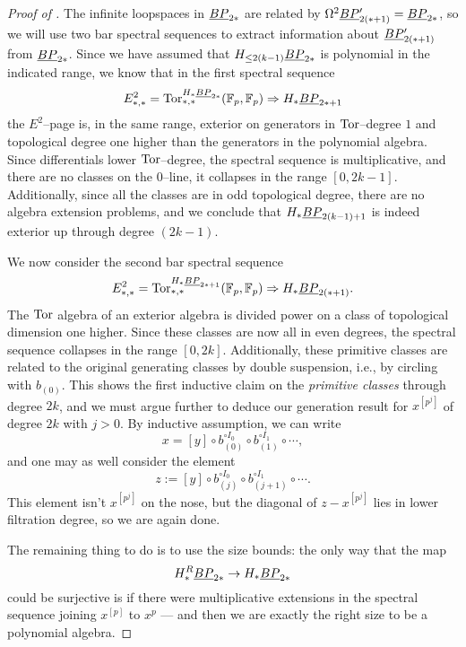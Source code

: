 \begin{proof}[{Proof of }]
The infinite loopspaces in $\underline{\smash{BP}}_{2*}$ are related by $\Omega^2 \underline{\smash{BP}}_{2(*+1)}' = \underline{\smash{BP}}_{2*}$, so we will use two bar spectral sequences to extract information about $\underline{\smash{BP}}_{2(*+1)}'$ from $\underline{\smash{BP}}_{2*}$.  Since we have assumed that $H_{\le 2(k-1)} \underline{\smash{BP}}_{2*}$ is polynomial in the indicated range, we know that in the first spectral sequence \[E^2_{*, *} = \operatorname{Tor}^{H_* \underline{\smash{BP}}_{2*}}_{*, *}(\mathbb F_p, \mathbb F_p) \Rightarrow H_* \underline{\smash{BP}}_{2*+1}\] the $E^2$--page is, in the same range, exterior on generators in $\operatorname{Tor}$--degree $1$ and topological degree one higher than the generators in the polynomial algebra.  Since differentials lower $\operatorname{Tor}$--degree, the spectral sequence is multiplicative, and there are no classes on the $0$--line, it collapses in the range $[0, 2k-1]$.  Additionally, since all the classes are in odd topological degree, there are no algebra extension problems, and we conclude that $H_* \underline{\smash{BP}}_{2(k-1)+1}$ is indeed exterior up through degree $(2k-1)$.

We now consider the second bar spectral sequence \[E^2_{*, *} = \operatorname{Tor}^{H_* \underline{\smash{BP}}_{2*+1}}_{*, *}(\mathbb F_p, \mathbb F_p) \Rightarrow H_* \underline{\smash{BP}}_{2(*+1)}.\]  The $\operatorname{Tor}$ algebra of an exterior algebra is divided power on a class of topological dimension one higher.  Since these classes are now all in even degrees, the spectral sequence collapses in the range $[0, 2k]$.  Additionally, these primitive classes are related to the original generating classes by double suspension, i.e., by circling with $b_{(0)}$.  This shows the first inductive claim on the \emph{primitive classes} through degree $2k$, and we must argue further to deduce our generation result for $x^{[p^j]}$ of degree $2k$ with $j > 0$.  By inductive assumption, we can write \[x = [y] \circ b_{(0)}^{\circ I_0} \circ b_{(1)}^{\circ I_1} \circ \cdots,\] and one may as well consider the element \[z := [y] \circ b_{(j)}^{\circ I_0} \circ b_{(j+1)}^{\circ I_1} \circ \cdots.\]  This element isn't $x^{[p^j]}$ on the nose, but the diagonal of $z - x^{[p^j]}$ lies in lower filtration degree, so we are again done.

The remaining thing to do is to use the size bounds: the only way that the map \[H_*^R \underline{\smash{BP}}_{2*} \to H_* \underline{\smash{BP}}_{2*}\] could be surjective is if there were multiplicative extensions in the spectral sequence joining $x^{[p]}$ to $x^p$ --- and then we are exactly the right size to be a polynomial algebra.
\end{proof}

